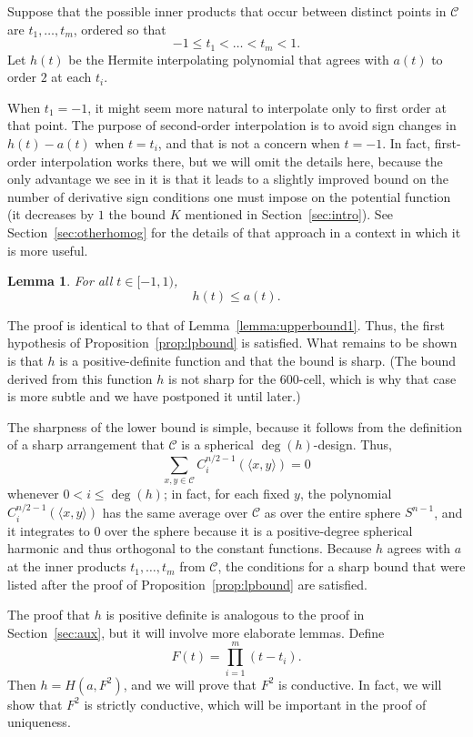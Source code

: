 \documentclass{jams-l}
\theoremstyle{plain}
\newtheorem{lemma}[theorem]{Lemma}
\numberwithin{theorem}{section}
\theoremstyle{definition}
\numberwithin{equation}{section}
\newcommand{\CodeS}{\mathcal{C}}
\begin{document}
Suppose that the possible inner products that occur between
distinct points in $\CodeS$ are $t_1,\dots,t_m$, ordered so that
$$
-1 \le t_1 < \dots < t_m < 1.
$$
Let $h(t)$ be the Hermite interpolating polynomial that agrees
with $a(t)$ to order $2$ at each $t_i$.

When $t_1=-1$, it might seem more natural to interpolate only to
first order at that point.  The purpose of second-order
interpolation is to avoid sign changes in $h(t)-a(t)$ when
$t=t_i$, and that is not a concern when $t=-1$.  In fact, 
first-order interpolation works there, but we will omit the details
here, because the only advantage we see in it is that it leads to
a slightly improved bound on the number of derivative sign
conditions one must impose on the potential function (it decreases
by $1$ the bound $K$ mentioned in Section~\ref{sec:intro}). See
Section~\ref{sec:otherhomog} for the details of that approach in a
context in which it is more useful.

\begin{lemma} \label{lemma:upperbound}
For all $t \in [-1,1)$,
$$
h(t) \le a(t).
$$
\end{lemma}

The proof is identical to that of Lemma~\ref{lemma:upperbound1}.
Thus, the first hypothesis of Proposition~\ref{prop:lpbound} is
satisfied.  What remains to be shown is that $h$ is a
positive-definite function and that the bound is sharp.  (The
bound derived from this function $h$ is not sharp for the
$600$-cell, which is why that case is more subtle and we have
postponed it until later.)

The sharpness of the lower bound is simple, because it follows
from the definition of a sharp arrangement that $\CodeS$ is a
spherical $\deg(h)$-design.  Thus,
$$
\sum_{x,y \in \CodeS} C^{n/2-1}_i(\langle x,y \rangle) = 0
$$
whenever $0 < i \le \deg(h)$;  in fact, for each fixed $y$, the
polynomial $C^{n/2-1}_i(\langle x,y \rangle)$ has the same average
over $\CodeS$ as over the entire sphere $S^{n-1}$, and it
integrates to $0$ over the sphere because it is a positive-degree
spherical harmonic and thus orthogonal to the constant functions.
Because $h$ agrees with $a$ at the inner products $t_1,\dots,t_m$
from $\CodeS$, the conditions for a sharp bound that were listed
after the proof of Proposition~\ref{prop:lpbound} are satisfied.

The proof that $h$ is positive definite is analogous to the proof
in Section~\ref{sec:aux}, but it will involve more elaborate
lemmas.  Define
$$
F(t) = \prod_{i=1}^m (t-t_i).
$$
Then $h = H(a,F^2)$, and we will prove that $F^2$ is conductive.
In fact, we will show that $F^2$ is strictly conductive, which
will be important in the proof of uniqueness.
\end{document}

